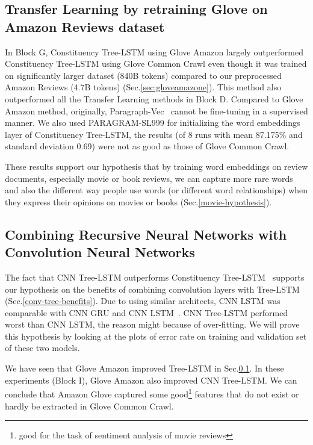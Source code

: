\subsection{Transfer Learning by retraining Glove on Amazon Reviews dataset}
\label{fact:glove-amazon-improve-tree}
In Block G, Constituency Tree-LSTM using Glove Amazon largely outperformed Constituency Tree-LSTM using Glove Common Crawl even though it was trained on significantly larger dataset (840B tokens) compared to our preprocessed Amazon Reviews (4.7B tokens) (Sec.\ref{sec:gloveamazone}).
This method also outperformed all the Transfer Learning methods in Block D.
Compared to Glove Amazon method, originally,  Paragraph-Vec~\cite{ParagraphVec} cannot be fine-tuning in a supervised manner.
We also used PARAGRAM-SL999 for initializing the word embeddings layer of Constituency Tree-LSTM,
the results (of 8 runs with mean 87.175\% and standard deviation 0.69) were not as good as those of Glove Common Crawl.

These results support our hypothesis that by training word embeddings on review documents, especially movie or book reviews, we can capture more rare words and also the different way people use words (or different word relationships) when they express their opinions on movies or books (Sec.\ref{movie-hypothesis}).

\subsection{Combining Recursive Neural Networks with Convolution Neural Networks}
\label{proved:tree-conv-benefit}
The fact that CNN Tree-LSTM outperforms Constituency Tree-LSTM~\cite{treeLSTM} supports our hypothesis on the benefits of combining convolution layers with Tree-LSTM (Sec.\ref{conv-tree-benefits}).
Due to using similar architects, CNN LSTM was comparable with CNN GRU and CNN LSTM~\cite{cnn-rnn}. \label{unproved:cnn-treelstm-overfit}
CNN Tree-LSTM performed worst than CNN LSTM, the reason might because of over-fitting.
We will prove this hypothesis by looking at the plots of error rate on training and validation set of these two models.

\label{proved:Amazon-adv-Common}
We have seen that Glove Amazon improved Tree-LSTM in Sec.\ref{fact:glove-amazon-improve-tree}.
In these experiments (Block I), Glove Amazon also improved CNN Tree-LSTM.
We can conclude that Amazon Glove captured some good\footnote{good for the task of sentiment analysis of movie reviews} features that do not exist or hardly be extracted in Glove Common Crawl.

